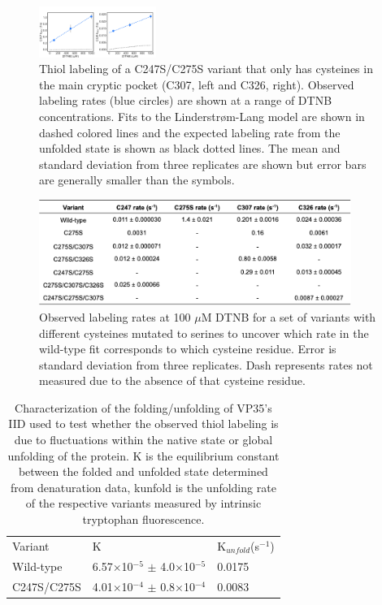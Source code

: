 \documentclass[../main.tex]{subfiles}
\begin{document}
    \begin{figure}[!htb] %
        \centering
        \includegraphics[width=1.5in]{ch5-suppfig5.png}
        \caption[Thiol labeling of a C247S/C275S variant that only has cysteines in the main cryptic pocket.]
            {Thiol labeling of a C247S/C275S variant that only has cysteines in the main cryptic pocket (C307, left and C326, right). Observed labeling rates (blue circles) are shown at a range of DTNB concentrations. Fits to the Linderstrøm-Lang model are shown in dashed colored lines and the expected labeling rate from the unfolded state is shown as black dotted lines. The mean and standard deviation from three replicates are shown but error bars are generally smaller than the symbols.}
        \label{fig:ch5-suppfig5}
    \end{figure}

    \begin{figure}[!htb] %
        \centering
        \includegraphics[width=4in]{ch5-suppfig6.png}
        \caption[Observed labeling rates at 100 $\mu$M DTNB for a set of variants.]
            {Observed labeling rates at 100 $\mu$M DTNB for a set of variants with different cysteines mutated to serines to uncover which rate in the wild-type fit corresponds to which cysteine residue. Error is standard deviation from three replicates. Dash represents rates not measured due to the absence of that cysteine residue.}
        \label{fig:ch5-suppfig6}
    \end{figure}

    \begin{table}[]
    \centering
    \caption[Characterization of the folding/unfolding of VP35’s IID]{Characterization of the folding/unfolding of VP35’s IID used to test whether the observed thiol labeling is due to fluctuations within the native state or global unfolding of the protein. K is the equilibrium constant between the folded and unfolded state determined from denaturation data, kunfold is the unfolding rate of the respective variants measured by intrinsic tryptophan fluorescence.}
    \label{tab:ch5-supptab1}
    \begin{tabular}{|l|l|l|}
    Variant     & K                     & K$_{unfold}$(s$^{-1}$) \\
    Wild-type   & 6.57$\times$10$^{-5}$ $\pm$ 4.0$\times$10$^{-5}$ & 0.0175         \\
    C247S/C275S & 4.01$\times$10$^{-4}$ $\pm$ 0.8$\times$10$^{-4}$ & 0.0083        
    \end{tabular}
    \end{table}
\end{document}
